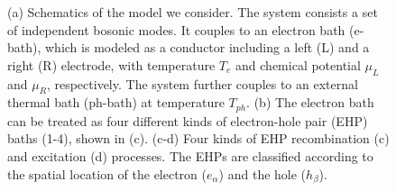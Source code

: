 \documentclass[aps,prb,
,floatfix,footinbib,shortbibliography,
preprint
]{revtex4-1}
\begin{document}
\begin{figure}
	\centering
	\quad
	\quad
	\quad
	\caption{(a) Schematics of the model we consider. The system consists a set of independent bosonic modes. It couples to an electron bath (e-bath), which is modeled as a conductor including a left (L) and a right (R) electrode, with temperature $T_e$ and chemical potential $\mu_L$ and $\mu_R$, respectively. The system further couples to an external thermal bath (ph-bath) at temperature $T_{ph}$. (b) The electron bath can be treated as four different kinds of electron-hole pair (EHP) baths (1-4), shown in (c). (c-d) Four kinds of EHP recombination (c) and excitation (d) processes. The EHPs are classified according to the spatial location of the electron ($e_\alpha$) and the hole ($h_\beta$).}
	\label{fig:ehp}
\end{figure}
\end{document}
